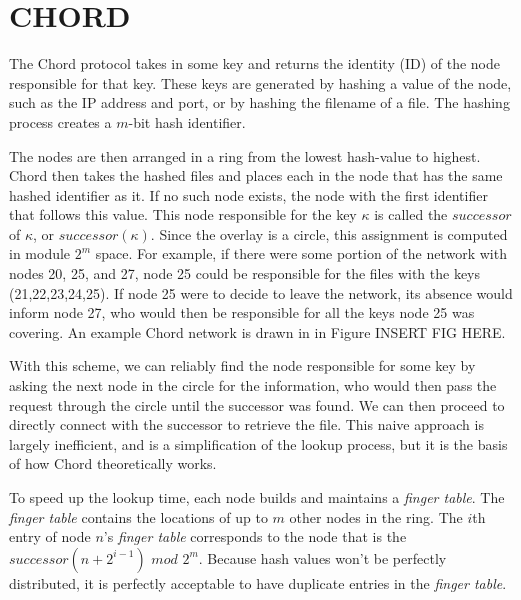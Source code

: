 \documentclass[conference, compsocconf, letterpaper]{IEEEtran}
\begin{document}




\section{CHORD}
The Chord protocol \cite{Chord} takes in some key and returns the identity (ID) of the node responsible for that key.  These keys are generated by hashing a value of the node, such as the IP address and port, or by hashing the filename of a file.  The hashing process creates a $m$-bit hash identifier.

The nodes are then arranged in a ring from the lowest hash-value to highest.  Chord then takes the hashed files and places each in the node that has the same hashed identifier as it.  If no such node exists, the node with the first identifier that follows this value.  This node responsible for the key $\kappa$ is called the $successor$ of $\kappa$, or $successor(\kappa)$.  Since the overlay is a circle, this assignment is computed in module $2^m$ space.  For example, if there were some portion of the network with nodes 20, 25, and 27, node 25 could be responsible for the files with the keys (21,22,23,24,25). If node 25 were to decide to leave the network, its absence would inform node 27, who would then be responsible for all the keys node 25 was covering. An example Chord network is drawn in in Figure INSERT FIG HERE.

With this scheme, we can reliably find the node responsible for some key by asking the next node in the circle for the information, who would then pass the request through the circle until the successor was found.  We can then proceed to directly connect with the successor to retrieve the file.  This naive approach is largely inefficient, and is a simplification of the lookup process, but it is the basis of how Chord theoretically works.

To speed up the lookup time, each node builds and maintains a \emph{finger table}.  The \emph{finger table} contains the locations of up to $m$ other nodes in the ring.  The $i$th entry of node $n$'s \emph{finger table} corresponds to the node that is the $successor(n+2^{i-1})$ $mod$ $2^m$. Because hash values won't be perfectly distributed, it is perfectly acceptable to have duplicate entries in the \emph{finger table}. 
\end{document}

